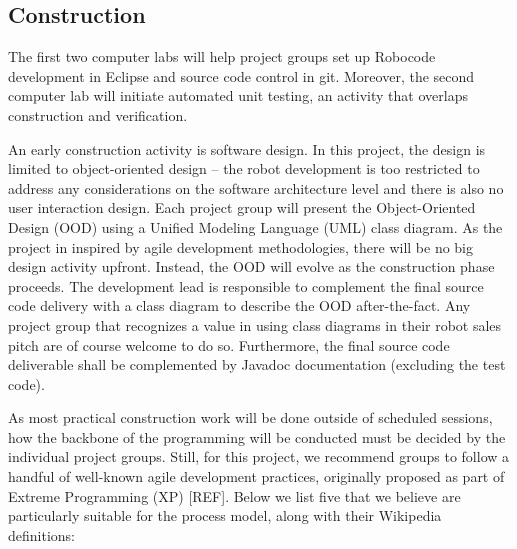 \documentclass{scrreprt}
\begin{document}
\subsection{Construction} \label{sec:constr}
The first two computer labs will help project groups set up Robocode development in Eclipse and source code control in git. Moreover, the second computer lab will initiate automated unit testing, an activity that overlaps construction and verification.

An early construction activity is software design. In this project, the design is limited to object-oriented design -- the robot development is too restricted to address any considerations on the software architecture level and there is also no user interaction design. Each project group will present the Object-Oriented Design (OOD) using a Unified Modeling Language (UML) class diagram. As the project in inspired by agile development methodologies, there will be no big design activity upfront. Instead, the OOD will evolve as the construction phase proceeds. The development lead is responsible to complement the final source code delivery with a class diagram to describe the OOD after-the-fact. Any project group that recognizes a value in using class diagrams in their robot sales pitch are of course welcome to do so. Furthermore, the final source code deliverable shall be complemented by Javadoc documentation (excluding the test code).  

As most practical construction work will be done outside of scheduled sessions, how the backbone of the programming will be conducted must be decided by the individual project groups. Still, for this project, we recommend groups to follow a handful of well-known agile development practices, originally proposed as part of Extreme Programming (XP) [REF]. Below we list five that we believe are particularly suitable for the process model, along with their Wikipedia definitions:
\end{document}
